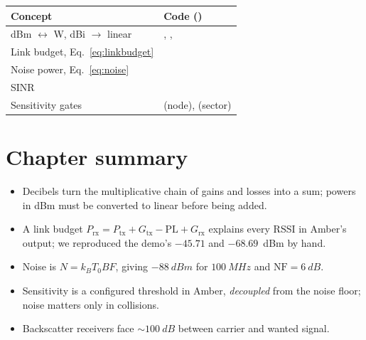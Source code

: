 \begin{codemap}
\small
\begin{tabularx}{\linewidth}{@{}>{\ttfamily}p{4.4cm}X@{}}
\toprule
\normalfont\bfseries Concept & \normalfont\bfseries Code (\file{amber/})\\
\midrule
dBm $\leftrightarrow$ W, dBi $\to$ linear & \codew{propagation.dbm_to_watts}, \codew{watts_to_dbm}, \codew{lin_from_dbi}\\
Link budget, Eq.~\eqref{eq:linkbudget} & \codew{propagation.compute_rx_power_watts}\\
Noise power, Eq.~\eqref{eq:noise} & \codew{packet_analysis.thermal_noise_watts}\\
SINR & \codew{packet_analysis.apply_sic}\\
Sensitivity gates & \codew{backscatter.receive_command} (node), \codew{bsengine._process_rx_buffer} (sector)\\
\bottomrule
\end{tabularx}
\end{codemap}

\section{Chapter summary}
\begin{itemize}
 \item Decibels turn the multiplicative chain of gains and losses into a sum; powers in dBm must be converted to linear before being added.
 \item A link budget $P_{\mathrm{rx}}=P_{\mathrm{tx}}+G_{\mathrm{tx}}-\mathrm{PL}+G_{\mathrm{rx}}$ explains every RSSI in Amber's output; we reproduced the demo's $-45.71$ and $-68.69$~dBm by hand.
 \item Noise is $N=k_BT_0BF$, giving $\SI{-88}{dBm}$ for $\SI{100}{MHz}$ and $\mathrm{NF}=\SI{6}{dB}$.
 \item Sensitivity is a configured threshold in Amber, \emph{decoupled} from the noise floor; noise matters only in collisions.
 \item Backscatter receivers face $\sim\SI{100}{dB}$ between carrier and wanted signal.
\end{itemize}

